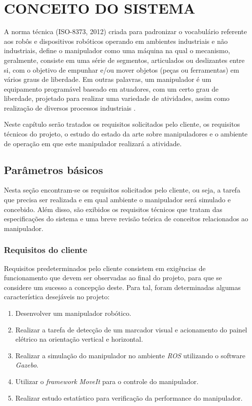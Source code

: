 \chapter{CONCEITO DO SISTEMA}
\label{chap:conce}
A norma técnica (ISO-8373, 2012) criada para padronizar o vocabulário referente aos
robôs e dispositivos robóticos operando em ambientes industriais e não industriais, define o manipulador como uma máquina na qual o mecanismo, geralmente, consiste em uma série de segmentos, articulados ou deslizantes entre si, com o objetivo de empunhar e/ou mover objetos (peças ou ferramentas) em vários graus de liberdade. Em outras palavras, um manipulador é um equipamento programável baseado em atuadores, com um certo grau de liberdade, projetado para realizar uma variedade de atividades, assim como realização de diversos processos industriais \cite{ISO8373}.

Neste capítulo serão tratados os requisitos solicitados pelo cliente, os requisitos técnicos do projeto, o estudo do estado da arte sobre manipuladores e o ambiente de operação em que este manipulador realizará a atividade.

\section{Parâmetros básicos}
\label{sec:basi}
Nesta seção encontram-se os requisitos solicitados pelo cliente, ou seja, a tarefa que precisa ser realizada e em qual ambiente o manipulador será simulado e concebido. Além disso, são exibidos os requisitos técnicos que tratam das especificações do sistema e uma breve revisão teórica de conceitos relacionados ao manipulador.

\subsection{Requisitos do cliente}
\label{sub:reqc}
Requisitos predeterminados pelo cliente consistem em exigências de funcionamento que devem ser observadas ao final do projeto, para que se considere um sucesso a concepção deste. Para tal, foram determinadas algumas característica desejáveis no projeto:
\begin{enumerate}
    \item Desenvolver um manipulador robótico.
    \item Realizar a tarefa de detecção de um marcador visual e acionamento do painel elétrico na orientação vertical e horizontal.
    \item Realizar a simulação do manipulador no ambiente \textit{\acs{ROS}} utilizando o software \textit{Gazebo}.
    \item Utilizar o \textit{framework} \textit{MoveIt} para o controle do  manipulador. 
    \item Realizar estudo estatístico para verificação da performance do manipulador.    
\end{enumerate}

